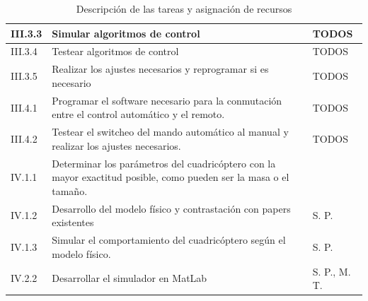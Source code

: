 \documentclass[spanish,12pt,a4paper,titlepage]{report}
\begin{document}
\begin{table}[H]
\begin{tabular}{|p{50pt}|p{250pt}|p{100pt}|}
III.3.3  & Simular algoritmos de control & TODOS \\ \hline
III.3.4  & Testear algoritmos de control & TODOS \\ \hline
III.3.5  & Realizar los ajustes necesarios y reprogramar si es necesario & TODOS \\ \hline
III.4.1  & Programar el software necesario para la conmutación entre el control automático y el remoto. & TODOS \\ \hline
III.4.2  & Testear el switcheo del mando automático al manual y realizar los ajustes necesarios. & TODOS \\ \hline \hline
IV.1.1  &  Determinar los parámetros del cuadricóptero con la mayor exactitud posible, como pueden ser la masa o el tamaño.  &  \\ \hline
IV.1.2  & Desarrollo del modelo físico y contrastación con papers existentes & S. P. \\ \hline
IV.1.3  &  Simular el comportamiento del cuadricóptero según el modelo físico. & S. P.    \\ \hline
IV.2.2  &  Desarrollar el simulador en MatLab & S. P., M. T.    \\ \hline
\end{tabular} 
\caption{Descripción de las tareas y asignación de recursos}
\label{tab:tareas_y_recursos}
\end{table}
\end{document}

